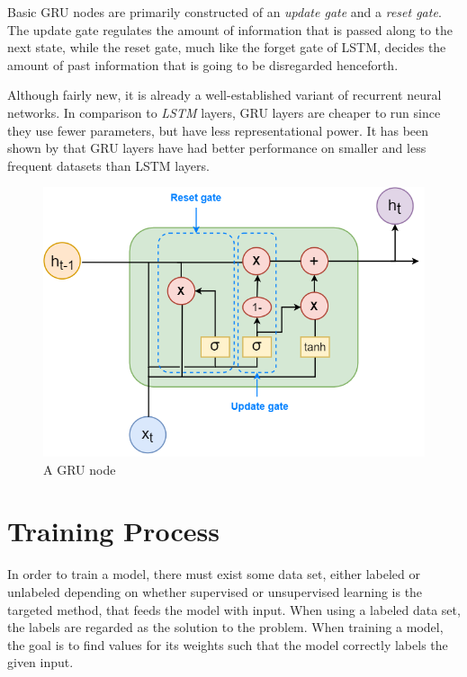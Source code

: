 \documentclass[nofilelist]{cslthse-msc}
\begin{document}
Basic GRU nodes  are primarily constructed of an \textit{update gate} and a \textit{reset gate}. The update gate regulates the amount of information that is passed along to the next state, while the reset gate, much like the forget gate of LSTM, decides the amount of past information that is going to be disregarded henceforth. 

Although fairly new, it is already a well-established variant of recurrent neural networks. In comparison to \textit{LSTM} layers, GRU layers are cheaper to run since they use fewer parameters, but have less representational power. It has been shown by \citet{Gruber2020AreGC} that GRU layers have had better performance on smaller and less frequent datasets than LSTM layers.



\begin{figure}[!ht]
    \centering
    \includegraphics[scale=0.5]{msccls/explanatory_images/gru.png}
    \caption{A GRU node}
    \label{fig:gru_node}
\end{figure}


\section{Training Process}
In order to train a model, there must exist some data set, either labeled or unlabeled depending on whether supervised or unsupervised learning is the targeted method, that feeds the model with input. When using a labeled data set, the labels are regarded as the solution to the problem. When training a model, the goal is to find values for its weights such that the model correctly labels the given input. 
\end{document}
